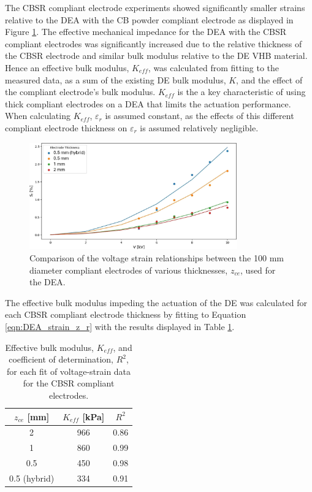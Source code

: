 	The CBSR compliant electrode experiments showed significantly smaller strains relative to the DEA with the CB powder compliant electrode as displayed in Figure \ref{fig:DEA_CBSR_thickness_results}. The effective mechanical impedance for the DEA with the CBSR compliant electrodes was significantly increased due to the relative thickness of the CBSR electrode and similar bulk modulus relative to the DE VHB material. Hence an effective bulk modulus, $K_{e\!f\!f}$, was calculated from fitting to the measured data, as a sum of the existing DE bulk modulus, $K$, and the effect of the compliant electrode's bulk modulus. $K_{e\!f\!f}$ is the a key characteristic of using thick compliant electrodes on a DEA that limits the actuation performance. When calculating $K_{e\!f\!f}$, $\varepsilon_r$ is assumed constant, as the effects of this different compliant electrode thickness on $\varepsilon_r$ is assumed relatively negligible. %
	\begin{figure}[H]
		\centering
		\includegraphics[width = 0.8\textwidth]{Figures/DEA_CBSR_thickness_strains_vs_fits_hyb.jpg}
        \vspace{0.2cm}
		\caption{Comparison of the voltage strain relationships between the 100 mm diameter compliant electrodes of various thicknesses, $z_{ce}$, used for the DEA.}
		\label{fig:DEA_CBSR_thickness_results}
	\end{figure}
	The effective bulk modulus impeding the actuation of the DE was calculated for each CBSR compliant electrode thickness by fitting to Equation \ref{eqn:DEA_strain_z_r} with the results displayed in Table \ref{tab:cbsr_bulk_mods}.
	\begin{table}[h!]
		\begin{center}
			\caption{Effective bulk modulus, $K_{e\!f\!f}$,  and coefficient of determination, $R^2$, for each fit of voltage-strain data for the CBSR compliant electrodes.}
			\vspace{0.5cm}
			\label{tab:cbsr_bulk_mods}
			\begin{tabular}{c|c|c} %
				$z_{ce}$ [mm] & $K_{e\!f\!f}$ [kPa] & $R^2$ \\
				\hline
				2 & 966 & 0.86\\
				1 & 860 & 0.99\\
				0.5 & 450 & 0.98 \\
				0.5 (hybrid) & 334 & 0.91\\
			\end{tabular}
		\end{center}
	\end{table}
